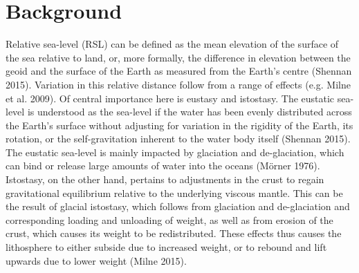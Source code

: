 \documentclass[
]{article}
\begin{document}
\hypertarget{background}{%
\section{Background}\label{background}}

Relative sea-level (RSL) can be defined as the mean elevation of the surface of the sea relative to land, or, more formally, the difference in elevation between the geoid and the surface of the Earth as measured from the Earth's centre (Shennan 2015). Variation in this relative distance follow from a range of effects (e.g. Milne et al. 2009). Of central importance here is eustasy and istostasy. The eustatic sea-level is understood as the sea-level if the water has been evenly distributed across the Earth's surface without adjusting for variation in the rigidity of the Earth, its rotation, or the self-gravitation inherent to the water body itself (Shennan 2015). The eustatic sea-level is mainly impacted by glaciation and de-glaciation, which can bind or release large amounts of water into the oceans (Mörner 1976). Istostasy, on the other hand, pertains to adjustments in the crust to regain gravitational equilibrium relative to the underlying viscous mantle. This can be the result of glacial istostasy, which follows from glaciation and de-glaciation and corresponding loading and unloading of weight, as well as from erosion of the crust, which causes its weight to be redistributed. These effects thus causes the lithosphere to either subside due to increased weight, or to rebound and lift upwards due to lower weight (Milne 2015).
\end{document}
